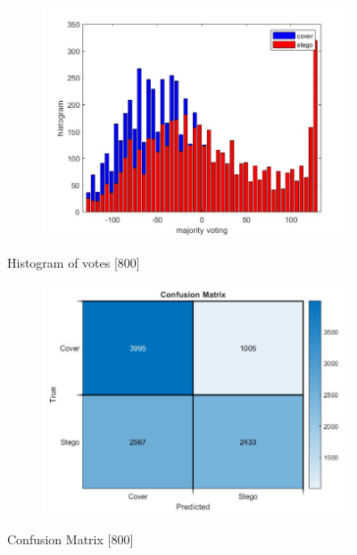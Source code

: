 \begin{figure}[H]
    \centering
    \begin{subfigure}[b]{0.5\textwidth}
        \includegraphics[width=\textwidth]{img/800/histogramgray.jpg}
    \end{subfigure}
    \caption{Histogram of votes [800]}
\begin{table}[H]
    \centering
        \begin{subfigure}[b]{0.5\textwidth}
            \includegraphics[width=\textwidth]{img/800/confusegray.jpg}
        \end{subfigure}
    \caption{Confusion Matrix [800]}
\end{table}
\end{figure}

